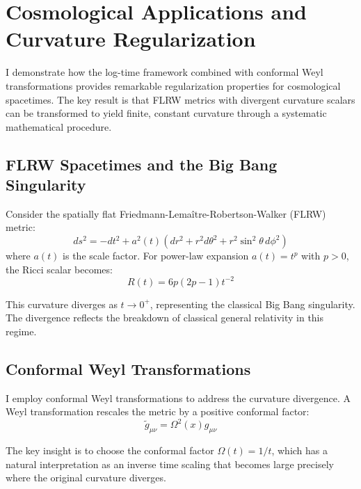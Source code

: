 \section{Cosmological Applications and Curvature Regularization}
\label{sec:cosmology}

I demonstrate how the log-time framework combined with conformal Weyl transformations provides remarkable regularization properties for cosmological spacetimes. The key result is that FLRW metrics with divergent curvature scalars can be transformed to yield finite, constant curvature through a systematic mathematical procedure.

\subsection{FLRW Spacetimes and the Big Bang Singularity}
\label{subsec:flrw_spacetimes}

Consider the spatially flat Friedmann-Lemaître-Robertson-Walker (FLRW) metric:
\begin{equation}
ds^2 = -dt^2 + a^2(t) \left( dr^2 + r^2 d\theta^2 + r^2 \sin^2\theta \, d\phi^2 \right)
\label{eq:flrw_metric}
\end{equation}
where $a(t)$ is the scale factor. For power-law expansion $a(t) = t^p$ with $p > 0$, the Ricci scalar becomes:
\begin{equation}
R(t) = 6p(2p-1) t^{-2}
\label{eq:flrw_ricci_original}
\end{equation}

This curvature diverges as $t \to 0^+$, representing the classical Big Bang singularity. The divergence reflects the breakdown of classical general relativity in this regime.

\subsection{Conformal Weyl Transformations}
\label{subsec:weyl_transformations}

I employ conformal Weyl transformations to address the curvature divergence. A Weyl transformation rescales the metric by a positive conformal factor:
\begin{equation}
\tilde{g}_{\mu\nu} = \Omega^2(x) g_{\mu\nu}
\label{eq:weyl_transformation}
\end{equation}

The key insight is to choose the conformal factor $\Omega(t) = 1/t$, which has a natural interpretation as an inverse time scaling that becomes large precisely where the original curvature diverges.

